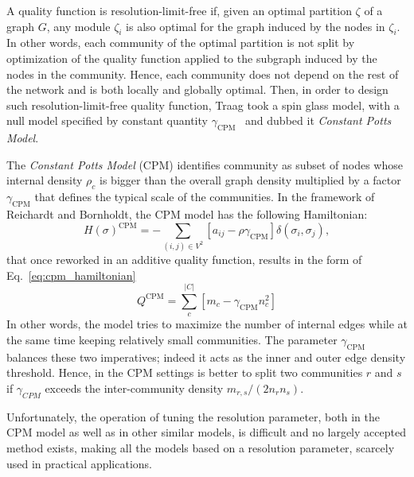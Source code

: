 A quality function is resolution-limit-free if, given an optimal partition $\zeta$ of a graph $G$, any module $\zeta_i$ is also optimal for the graph induced by the nodes in $\zeta_i$.
In other words, each community of the optimal partition is not split by optimization of the quality function applied to the subgraph induced by the nodes in the community.
Hence, each community does not depend on the rest of the network and is both locally and globally optimal.
Then, in order to design such resolution-limit-free quality function, Traag took a spin glass model, with a null model specified by constant quantity $\gamma_{\textrm{CPM}}$~\cite{traag2011} and dubbed it \emph{Constant Potts Model}.

The \emph{Constant Potts Model} (CPM) identifies community as subset of nodes whose internal density $\rho_c$ is bigger than the overall graph density multiplied by a factor $\gamma_{\textrm{CPM}}$ that defines the typical scale of the communities. In the framework of Reichardt and Bornholdt, the CPM model has the following Hamiltonian: 
\begin{equation}\label{eq:cpm_hamiltonian}
H(\sigma)^{\textrm{CPM}} = - \sum \limits_{(i,j) \in V^2} \left[ a_{ij} - \rho \gamma_{\textrm{CPM}} \right] \delta(\sigma_i,\sigma_j),
\end{equation}
that once reworked in an additive quality function, results in the form of Eq.~\ref{eq:cpm_hamiltonian} 
\begin{equation}\label{eq:cpm_ermodel}
Q^{\textrm{CPM}} = \sum \limits_c^{|C|} \left[m_c - \gamma_{\textrm{CPM}} n_c^2 \right] 
\end{equation}
In other words, the model tries to maximize the number of internal edges while at the same time keeping relatively small communities. The parameter $\gamma_{\textrm{CPM}}$ balances these two imperatives; indeed it acts as the inner and outer edge density threshold.
Hence, in the CPM settings is better to split two communities $r$ and $s$ if $\gamma_{CPM}$ exceeds the inter-community density $m_{r,s}/(2n_r n_s)$.

Unfortunately, the operation of tuning the resolution parameter, both in the CPM model as well as in other similar models, is difficult and no largely accepted method exists, making all the models based on a resolution parameter, scarcely used in practical applications.


